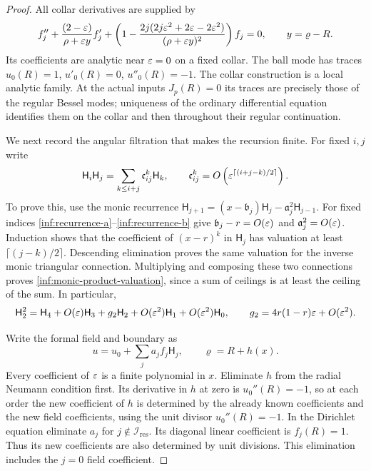 \begin{proof}
All collar derivatives are supplied by
\begin{equation}\label{inf:collar-ode}
 f_j''+\frac{(2-\varepsilon)}{\rho+\varepsilon y}f_j'
 +\left(1-\frac{2j(2j\varepsilon^2+2\varepsilon-2\varepsilon^2)}
                    {(\rho+\varepsilon y)^2}\right)f_j=0,
 \qquad y=\varrho-R.
\end{equation}
Its coefficients are analytic near $\varepsilon=0$ on a fixed collar.
The ball mode has traces $u_0(R)=1$, $u'_0(R)=0$, $u''_0(R)=-1$.
The collar construction is a local analytic family.
At the actual inputs $J_p(R)=0$ its traces
are precisely those of the regular Bessel modes; uniqueness of the
ordinary differential equation identifies them on the collar and
then throughout their regular continuation.

We next record the angular filtration that makes the recursion finite.
For fixed $i,j$ write
\begin{equation}\label{inf:monic-product-valuation}
 \mathsf H_i\mathsf H_j=\sum_{k\le i+j}\mathfrak c_{ij}^k\mathsf H_k,\qquad
 \mathfrak c_{ij}^k=O\left(\varepsilon^{\lceil(i+j-k)/2\rceil}\right).
\end{equation}
To prove this, use the monic recurrence
$\mathsf H_{j+1}=(x-\mathfrak b_j)\mathsf H_j-\mathfrak a_j^2\mathsf H_{j-1}$.
For fixed indices \eqref{inf:recurrence-a}--\eqref{inf:recurrence-b}
give $\mathfrak b_j-r=O(\varepsilon)$ and
$\mathfrak a_j^2=O(\varepsilon)$.
Induction shows that the coefficient of $(x-r)^k$ in $\mathsf H_j$ has
valuation at least $\lceil(j-k)/2\rceil$. Descending elimination
proves the same valuation for the inverse monic triangular
connection. Multiplying and composing these two connections proves
\eqref{inf:monic-product-valuation}, since a sum of ceilings is at
least the ceiling of the sum. In particular,
\begin{equation}\label{inf:seed-square}
 \mathsf H_2^2=\mathsf H_4+O(\varepsilon)\mathsf H_3+g_2\mathsf H_2+O(\varepsilon^2)\mathsf H_1+O(\varepsilon^2)\mathsf H_0,
 \qquad g_2=4r(1-r)\varepsilon+O(\varepsilon^2).
\end{equation}

Write the formal field and boundary as
\[
 u=u_0+\sum_j a_jf_j\mathsf H_j,\qquad \varrho=R+h(x).
\]
Every coefficient of $\varepsilon$ is a finite polynomial in $x$.
Eliminate $h$ from the radial Neumann condition first. Its derivative
in $h$ at zero is $u_0''(R)=-1$, so at each order the new coefficient
of $h$ is determined by the already known coefficients and the new
field coefficients, using the unit divisor $u_0''(R)=-1$.
In the Dirichlet equation eliminate $a_j$ for $j\notin\mathcal I_{\mathrm{res}}$.
Its diagonal linear coefficient is $f_j(R)=1$. Thus its new
coefficients are also determined by unit divisions.
This elimination includes the $j=0$ field coefficient.


\end{proof}
